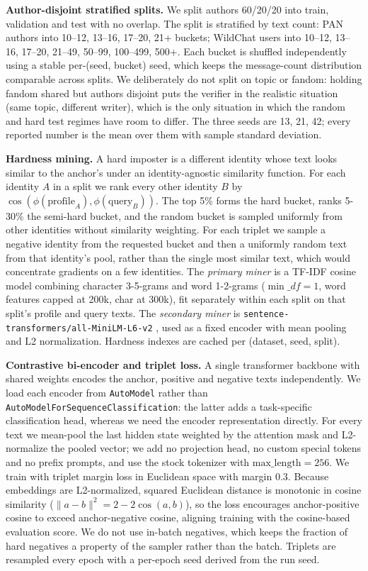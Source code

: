 \documentclass[11pt]{article}
\begin{document}
\noindent\textbf{Author-disjoint stratified splits.} We split authors 60/20/20 into train, validation and test with no overlap. The split is stratified by text count: PAN authors into 10--12, 13--16, 17--20, 21+ buckets; WildChat users into 10--12, 13--16, 17--20, 21--49, 50--99, 100--499, 500+. Each bucket is shuffled independently using a stable per-(seed, bucket) seed, which keeps the message-count distribution comparable across splits. We deliberately do not split on topic or fandom: holding fandom shared but authors disjoint puts the verifier in the realistic situation (same topic, different writer), which is the only situation in which the random and hard test regimes have room to differ. The three seeds are 13, 21, 42; every reported number is the mean over them with sample standard deviation.

\noindent\textbf{Hardness mining.} A hard imposter is a different identity whose text looks similar to the anchor's under an identity-agnostic similarity function. For each identity $A$ in a split we rank every other identity $B$ by $\cos(\phi(\text{profile}_A), \phi(\text{query}_B))$. The top 5\% forms the hard bucket, ranks 5-30\% the semi-hard bucket, and the random bucket is sampled uniformly from other identities without similarity weighting. For each triplet we sample a negative identity from the requested bucket and then a uniformly random text from that identity's pool, rather than the single most similar text, which would concentrate gradients on a few identities. The \textit{primary miner} is a TF-IDF cosine model combining character 3-5-grams and word 1-2-grams ($\min\_df{=}1$, word features capped at 200k, char at 300k), fit separately within each split on that split's profile and query texts. The \textit{secondary miner} is \texttt{sentence-transformers/all-MiniLM-L6-v2} \citep{reimers2019sentencebert}, used as a fixed encoder with mean pooling and L2 normalization. Hardness indexes are cached per (dataset, seed, split).

\noindent\textbf{Contrastive bi-encoder and triplet loss.} A single transformer backbone with shared weights encodes the anchor, positive and negative texts independently. We load each encoder from \texttt{AutoModel} rather than \texttt{AutoModelForSequenceClassification}: the latter adds a task-specific classification head, whereas we need the encoder representation directly. For every text we mean-pool the last hidden state weighted by the attention mask and L2-normalize the pooled vector; we add no projection head, no custom special tokens and no prefix prompts, and use the stock tokenizer with $\text{max\_length}=256$. We train with triplet margin loss in Euclidean space with margin $0.3$. Because embeddings are L2-normalized, squared Euclidean distance is monotonic in cosine similarity ($\|a-b\|^2 = 2 - 2\cos(a,b)$), so the loss encourages anchor-positive cosine to exceed anchor-negative cosine, aligning training with the cosine-based evaluation score. We do not use in-batch negatives, which keeps the fraction of hard negatives a property of the sampler rather than the batch. Triplets are resampled every epoch with a per-epoch seed derived from the run seed.
\end{document}
